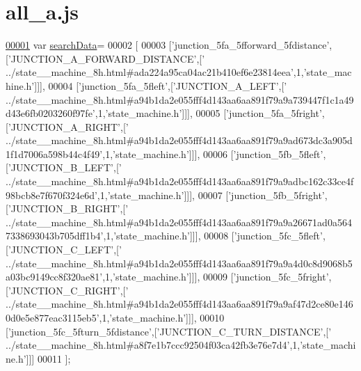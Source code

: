 \hypertarget{all__a_8js_source}{}\section{all\+\_\+a.\+js}
\label{all__a_8js_source}

\begin{DoxyCode}
\hypertarget{all__a_8js_source.tex_l00001}{}\hyperlink{all__a_8js_ad01a7523f103d6242ef9b0451861231e}{00001} var \hyperlink{all__a_8js_ad01a7523f103d6242ef9b0451861231e}{searchData}=
00002 [
00003   [\textcolor{stringliteral}{'junction\_5fa\_5fforward\_5fdistance'},[\textcolor{stringliteral}{'JUNCTION\_A\_FORWARD\_DISTANCE'},[\textcolor{stringliteral}{'
      ../state\_\_machine\_8h.html#ada224a95ca04ac21b410ef6e23814eea'},1,\textcolor{stringliteral}{'state\_machine.h'}]]],
00004   [\textcolor{stringliteral}{'junction\_5fa\_5fleft'},[\textcolor{stringliteral}{'JUNCTION\_A\_LEFT'},[\textcolor{stringliteral}{'
      ../state\_\_machine\_8h.html#a94b1da2e055fff4d143aa6aa891f79a9a739447f1c1a49d43e6fb0203260f97fe'},1,\textcolor{stringliteral}{'state\_machine.h'}]]],
00005   [\textcolor{stringliteral}{'junction\_5fa\_5fright'},[\textcolor{stringliteral}{'JUNCTION\_A\_RIGHT'},[\textcolor{stringliteral}{'
      ../state\_\_machine\_8h.html#a94b1da2e055fff4d143aa6aa891f79a9ad673dc3a905d1f1d7006a598b44c4f49'},1,\textcolor{stringliteral}{'state\_machine.h'}]]],
00006   [\textcolor{stringliteral}{'junction\_5fb\_5fleft'},[\textcolor{stringliteral}{'JUNCTION\_B\_LEFT'},[\textcolor{stringliteral}{'
      ../state\_\_machine\_8h.html#a94b1da2e055fff4d143aa6aa891f79a9adbc162c33ce4f98bcb8e7f670f324e6d'},1,\textcolor{stringliteral}{'state\_machine.h'}]]],
00007   [\textcolor{stringliteral}{'junction\_5fb\_5fright'},[\textcolor{stringliteral}{'JUNCTION\_B\_RIGHT'},[\textcolor{stringliteral}{'
      ../state\_\_machine\_8h.html#a94b1da2e055fff4d143aa6aa891f79a9a26671ad0a5647338693043b705dff1b4'},1,\textcolor{stringliteral}{'state\_machine.h'}]]],
00008   [\textcolor{stringliteral}{'junction\_5fc\_5fleft'},[\textcolor{stringliteral}{'JUNCTION\_C\_LEFT'},[\textcolor{stringliteral}{'
      ../state\_\_machine\_8h.html#a94b1da2e055fff4d143aa6aa891f79a9a4d0c8d9068b5a03bc9149cc8f320ae81'},1,\textcolor{stringliteral}{'state\_machine.h'}]]],
00009   [\textcolor{stringliteral}{'junction\_5fc\_5fright'},[\textcolor{stringliteral}{'JUNCTION\_C\_RIGHT'},[\textcolor{stringliteral}{'
      ../state\_\_machine\_8h.html#a94b1da2e055fff4d143aa6aa891f79a9af47d2ce80e1460d0e5e877eac3115eb5'},1,\textcolor{stringliteral}{'state\_machine.h'}]]],
00010   [\textcolor{stringliteral}{'junction\_5fc\_5fturn\_5fdistance'},[\textcolor{stringliteral}{'JUNCTION\_C\_TURN\_DISTANCE'},[\textcolor{stringliteral}{'
      ../state\_\_machine\_8h.html#a8f7e1b7ccc92504f03ca42fb3e76e7d4'},1,\textcolor{stringliteral}{'state\_machine.h'}]]]
00011 ];
\end{DoxyCode}
